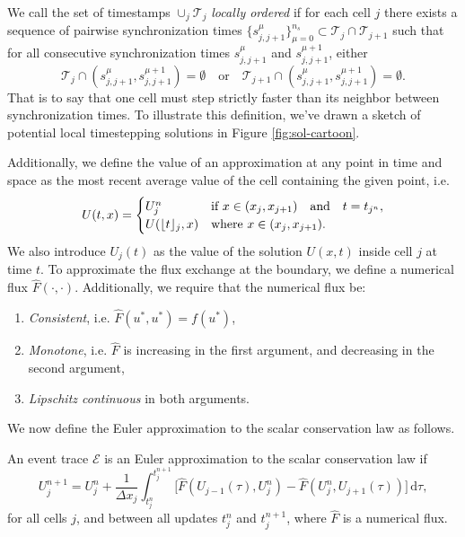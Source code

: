 We call the set of timestamps $\cup_j \mathcal{T}_j$ \emph{locally ordered} if for each cell $j$ there exists a sequence of pairwise synchronization times $\{s^{\mu}_{j,j+1}\}_{\mu=0}^{n_s} \subset \mathcal{T}_j \cap \mathcal{T}_{j+1}$ such that for all consecutive synchronization times $s^{\mu}_{j,j+1}$ and $s^{\mu+1}_{j,j+1}$, either
\begin{equation*}
\mathcal{T}_j \cap (s^{\mu}_{j,j+1}, s^{\mu+1}_{j,j+1}) = \emptyset \quad\text{or}\quad \mathcal{T}_{j+1} \cap (s^{\mu}_{j,j+1}, s^{\mu+1}_{j,j+1}) = \emptyset.
\end{equation*}
That is to say that one cell must step strictly faster than its neighbor between  synchronization times. To illustrate this definition, we've drawn a sketch of potential local timestepping solutions in Figure \ref{fig:sol-cartoon}.

Additionally, we define the value of an approximation at any point in time and space as the most recent average value of the cell containing the given point, i.e. 
\begin{equation*}
U(t,x) = \begin{cases}
U_j^n & \text{if } x \in (x_j, x_{j+1}) \quad \text{and} \quad t = t_{j^n},\\
U(\lfloor t \rfloor_j, x) & \text{where } x \in (x_j, x_{j+1}).
\end{cases}
\end{equation*}
We also introduce $U_j(t)$ as the value of the solution $U(x,t)$ inside cell $j$ at time $t$. To approximate the flux exchange at the boundary, we define a numerical flux $\hat{F}(\cdot, \cdot)$. Additionally, we require that the numerical flux be:
\begin{enumerate}
\item {\em Consistent}, i.e. $\hat{F}(u^*,u^*) = f(u^*)$,
\item {\em Monotone}, i.e. $\hat{F}$ is increasing in the first argument, and decreasing in the second argument,
\item {\em Lipschitz continuous} in both arguments.
\end{enumerate}
We now define the Euler approximation to the scalar conservation law as follows.
\begin{definition}
An event trace $\mathcal{E}$ is an Euler approximation to the scalar conservation law if
\begin{equation}
U_j^{n+1} = U_{j}^n + \frac{1}{\Delta x_j}\int_{t_j^n}^{t_j^{n+1}} \big[ \hat{F}(U_{j-1}(\tau), U_j^n) - \hat{F}(U_j^n,U_{j+1}(\tau)) \big] \,\mathrm{d}\tau,
\label{eq:update}
\end{equation}
for all cells $j$, and between all updates $t_j^n$ and $t_j^{n+1}$, where $\hat{F}$ is a numerical flux.
\end{definition}

